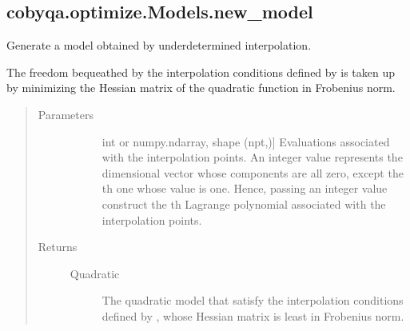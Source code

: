 \documentclass[letterpaper,10pt,english]{sphinxmanual}
\begin{document}
\begin{fulllineitems}
\begin{fulllineitems}
\begin{quote}
\begin{description}
\end{description}\end{quote}

\end{fulllineitems}



\subsection{cobyqa.optimize.Models.new\_model}
\label{\detokenize{refs/generated/cobyqa.optimize.Models.new_model:cobyqa-optimize-models-new-model}}\label{\detokenize{refs/generated/cobyqa.optimize.Models.new_model::doc}}

\begin{fulllineitems}
\label{\detokenize{refs/generated/cobyqa.optimize.Models.new_model:cobyqa.optimize.Models.new_model}}
\sphinxAtStartPar
Generate a model obtained by underdetermined interpolation.

\sphinxAtStartPar
The freedom bequeathed by the interpolation conditions defined by 
is taken up by minimizing the Hessian matrix of the quadratic function
in Frobenius norm.
\begin{quote}\begin{description}
\item[{Parameters}] \leavevmode\begin{description}
\item[{}] \leavevmode{[}int or numpy.ndarray, shape (npt,){]}
\sphinxAtStartPar
Evaluations associated with the interpolation points. An integer
value represents the \sphinxhyphen{}dimensional vector whose components are
all zero, except the \sphinxhyphen{}th one whose value is one. Hence,
passing an integer value construct the \sphinxhyphen{}th Lagrange polynomial
associated with the interpolation points.

\end{description}

\item[{Returns}] \leavevmode\begin{description}
\item[{Quadratic}] \leavevmode
\sphinxAtStartPar
The quadratic model that satisfy the interpolation conditions
defined by , whose Hessian matrix is least in Frobenius norm.


\end{description}
\end{description}
\end{quote}
\end{fulllineitems}
\end{fulllineitems}
\end{document}
